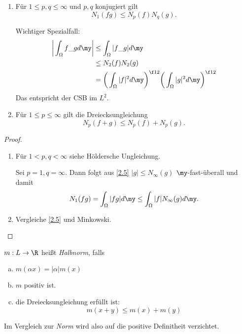 \begin{kor} \label{2.8}
	\begin{enumerate}[1)]
		\item
			Für $1 \le p,q \le \infty$ und $p,q$ konjugiert gilt
			\[
				N_1(fg) \le N_p(f) N_q(g).
			\]
			\begin{note}
				Wichtiger Spezialfall:
				\begin{align*}
					\bigg| \int_{\Omega} f \_g d\my \bigg|
					&\le \int_{\Omega} |f \_g| d\my \\
					&\le N_2(f) N_2(g) \\
					&= \bigg( \int_{\Omega} |f|^2 d\my \bigg)^{\f 12} \bigg( \int_{\Omega} |g|^2 d\my \bigg)^{\f 12}
				\end{align*}
				Das entspricht der CSB im $L^2$.
			\end{note}
		\item
			Für $1 \le p \le \infty$ gilt die Dreiecksungleichung
			\[
				N_p(f+g) \le N_p(f) + N_p(g).
			\]
	\end{enumerate}
	\begin{proof}
		\begin{enumerate}[1)]
			\item
				Für $1 < p,q < \infty$ siehe Höldersche Ungleichung.

				Sei $p=1, q = \infty$.
				Dann folgt aus \ref{2.5} $|g| \le N_\infty(g)$ $\my$-fast-überall und damit
				\[
					N_1(fg) = \int_{\Omega} |fg| d\my \le \int_{\Omega}|f| N_\infty (g) d\my.
				\]
			\item
				Vergleiche \ref{2.5} und Minkowski.
		\end{enumerate}
	\end{proof}
\end{kor}

\begin{df*} 
	$m : L \to \R$ heißt \emph{Halbnorm}, falls
	\begin{enumerate}[a)]
		\item
			$\displaystyle m(\alpha x) = |\alpha| m(x)$
		\item
			$m$ positiv ist.
		\item
			die Dreiecksungleichung erfüllt ist:
			\[
				m(x+y) \le m(x) + m(y)
			\]
	\end{enumerate}
	\begin{note}
		Im Vergleich zur \emph{Norm} wird also auf die positive Definitheit verzichtet.
	\end{note}
\end{df*}

